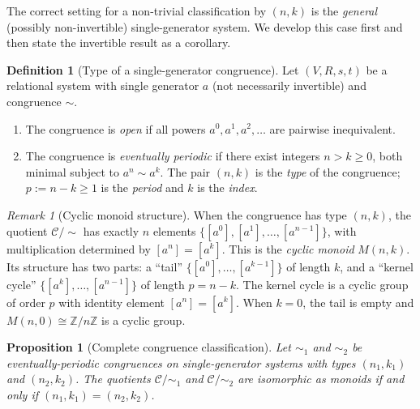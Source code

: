 \documentclass{article}
\newtheorem{proposition}[theorem]{Proposition}
\theoremstyle{definition}
\newtheorem{definition}[theorem]{Definition}
\theoremstyle{remark}
\newtheorem{remark}[theorem]{Remark}
\newcommand{\RC}{\mathcal{C}}
\begin{document}
The correct setting for a non-trivial classification by $(n,k)$
is the \emph{general} (possibly non-invertible) single-generator
system. We develop this case first and then state the invertible
result as a corollary.

\begin{definition}[Type of a single-generator congruence]
\label{def:type}
Let $(V, R, s, t)$ be a relational system with single generator
$a$ (not necessarily invertible) and congruence $\sim$.

\begin{enumerate}[label=(\roman*)]
  \item The congruence is \emph{open} if all powers
        $a^0, a^1, a^2, \ldots$ are pairwise inequivalent.
  \item The congruence is \emph{eventually periodic} if there
        exist integers $n > k \geq 0$, both minimal subject to
        $a^n \sim a^k$. The pair $(n, k)$ is the \emph{type} of
        the congruence; $p := n - k \geq 1$ is the \emph{period}
        and $k$ is the \emph{index}.
\end{enumerate}
\end{definition}

\begin{remark}[Cyclic monoid structure]
\label{rem:cyclicmonoid}
When the congruence has type $(n,k)$, the quotient $\RC/{\sim}$
has exactly $n$ elements $\{[a^0], [a^1], \ldots, [a^{n-1}]\}$,
with multiplication determined by $[a^n] = [a^k]$. This is the
\emph{cyclic monoid} $M(n,k)$. Its structure has two parts: a
``tail'' $\{[a^0], \ldots, [a^{k-1}]\}$ of length $k$, and a
``kernel cycle'' $\{[a^k], \ldots, [a^{n-1}]\}$ of length $p =
n - k$. The kernel cycle is a cyclic group of order $p$ with
identity element $[a^n] = [a^k]$. When $k = 0$, the tail is
empty and $M(n, 0) \cong \mathbb{Z}/n\mathbb{Z}$ is a cyclic group.
\end{remark}

\begin{proposition}[Complete congruence classification]
\label{prop:congclass}
Let $\sim_1$ and $\sim_2$ be eventually-periodic congruences on
single-generator systems with types $(n_1, k_1)$ and $(n_2, k_2)$.
The quotients $\RC/{\sim_1}$ and $\RC/{\sim_2}$ are isomorphic as
monoids if and only if $(n_1, k_1) = (n_2, k_2)$.
\end{proposition}
\end{document}
